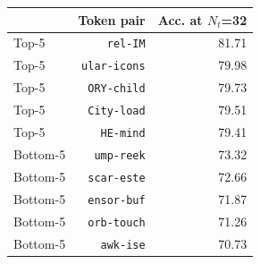 \begin{tabular}{lrr}
\toprule
 & Token pair & Acc. at $N_t$=32 \\
\midrule
Top-5 & \texttt{rel-IM} & 81.71 \\
Top-5 & \texttt{ular-icons} & 79.98 \\
Top-5 & \texttt{ORY-child} & 79.73 \\
Top-5 & \texttt{City-load} & 79.51 \\
Top-5 & \texttt{HE-mind} & 79.41 \\
Bottom-5 & \texttt{ump-reek} & 73.32 \\
Bottom-5 & \texttt{scar-este} & 72.66 \\
Bottom-5 & \texttt{ensor-buf} & 71.87 \\
Bottom-5 & \texttt{orb-touch} & 71.26 \\
Bottom-5 & \texttt{awk-ise} & 70.73 \\
\bottomrule
\end{tabular}
